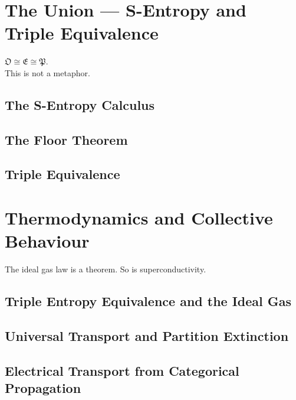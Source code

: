 \documentclass[12pt, twoside, openright]{book}
\theoremstyle{definition}
\theoremstyle{remark}
\newcommand{\Osc}{\mathfrak{O}}             %
\newcommand{\Cat}{\mathfrak{E}}             %
\newcommand{\Part}{\mathfrak{P}}            %
\begin{document}
\part{The Union --- S-Entropy and Triple Equivalence}
\label{part:union}

\epigraph{%
  $\Osc \cong \Cat \cong \Part$.\\
  This is not a metaphor.%
}{}

\chapter{The S-Entropy Calculus}
\label{ch:sentropy}


\chapter{The Floor Theorem}
\label{ch:floor}


\chapter{Triple Equivalence}
\label{ch:triple}


\part{Thermodynamics and Collective Behaviour}
\label{part:thermo}

\epigraph{%
  The ideal gas law is a theorem.
  So is superconductivity.%
}{}

\chapter{Triple Entropy Equivalence and the Ideal Gas}
\label{ch:idealgas}


\chapter{Universal Transport and Partition Extinction}
\label{ch:transport}


\chapter{Electrical Transport from Categorical Propagation}
\label{ch:electrical}

\end{document}

